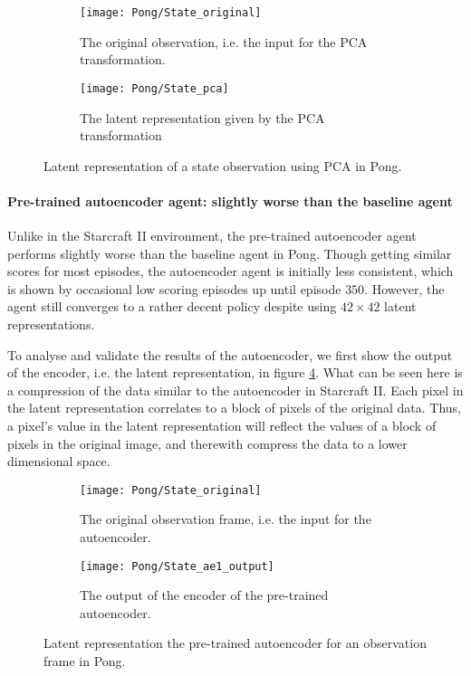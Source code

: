 \begin{figure}[h]
	\centering
	\begin{subfigure}[b]{0.3\textwidth}
		\texttt{[image: Pong/State\_original]}
		\caption{The original observation, i.e. the input for the PCA transformation.}
		\label{fig:pca-original-pong} 
	\end{subfigure}\hfill
	\begin{subfigure}[b]{0.3\textwidth}
		\texttt{[image: Pong/State\_pca]}
		\caption{The latent representation given by the PCA transformation}
		\label{fig:pca-latent-pong}
	\end{subfigure}
	\caption{Latent representation of a state observation using PCA in Pong.}
	\label{fig:pca-state-pong}
\end{figure}

\paragraph{Pre-trained autoencoder agent: slightly worse than the baseline agent}
Unlike in the Starcraft II environment, the pre-trained autoencoder agent performs slightly worse than the baseline agent in Pong. Though getting similar scores for most episodes, the autoencoder agent is initially less consistent, which is shown by occasional low scoring episodes up until episode $350$. However, the agent still converges to a rather decent policy despite using $42 \times 42$ latent representations.

To analyse and validate the results of the autoencoder, we first show the output of the encoder, i.e. the latent representation, in figure \ref{fig:ae-output-pong-pre}. What can be seen here is a compression of the data similar to the autoencoder in Starcraft II. Each pixel in the latent representation correlates to a block of pixels of the original data. Thus, a pixel's value in the latent representation will reflect the values of a block of pixels in the original image, and therewith compress the data to a lower dimensional space. 

\begin{figure}[h]
	\centering
	\begin{subfigure}[b]{0.40\textwidth}
		\texttt{[image: Pong/State\_original]}
		\caption{The original observation frame, i.e. the input for the autoencoder.}
	\end{subfigure}\hfill
	\begin{subfigure}[b]{0.40\textwidth}
		\texttt{[image: Pong/State\_ae1\_output]}
		\caption{The output of the encoder of the pre-trained autoencoder.}
		\medskip
	\end{subfigure}
	\caption{Latent representation the pre-trained autoencoder for an observation frame in Pong.}
	\label{fig:ae-output-pong-pre}
\end{figure}

